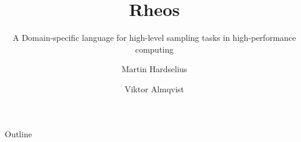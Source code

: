 \documentclass[10pt]{beamer}
\begin{document}
\title{Rheos}
\subtitle{A Domain-specific language for high-level sampling tasks in
  high-performance computing}
\author[Hardselius \and Almqvist]{Martin Hardselius \and Viktor Almqvist}


\begin{frame}
  \titlepage
\end{frame}


\begin{frame}{Outline}
\pause
\tableofcontents[pausesections]
\end{frame}








\end{document}
